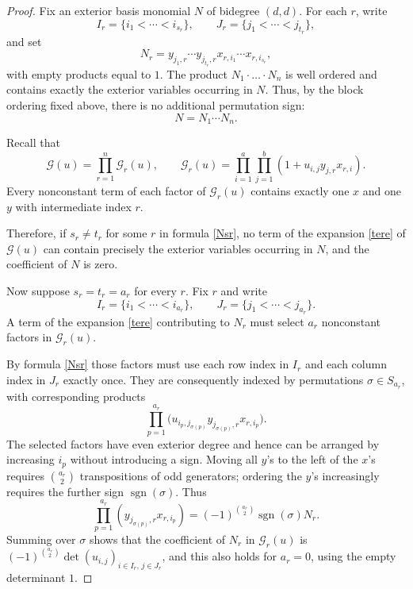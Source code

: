 \documentclass[10pt]{amsart}
\theoremstyle{definition}
\theoremstyle{remark}
\begin{document}
\begin{proof}
Fix an exterior basis monomial $N$ of bidegree $(d,d)$.
For each $r$, write
\[
 I_r=\{i_1<\cdots<i_{s_r}\},\qquad
 J_r=\{j_1<\cdots<j_{t_r}\},
\]
and set
\begin{equation}\label{Nsr}
N_r=
     y_{j_1,r}\cdots y_{j_{t_r},r}x_{r,i_1}\cdots x_{r,i_{s_r} },
\end{equation}
 with empty products equal to $1$.
The product  $N_1\cdot\ldots \cdot N_n$ is well ordered and contains exactly the exterior
variables occurring in $N$. Thus, by the block ordering fixed above, there is no additional
permutation sign:
\begin{equation}\label{eq:N-blocks}
 N=N_1\cdots N_n.
\end{equation}

Recall that
\[
 \mathcal G(u)=\prod_{r=1}^{n}\mathcal G_r(u),\qquad
 \mathcal G_r(u)=\prod_{i=1}^{a}\prod_{j=1}^{b}
 (1+u_{i,j}y_{j,r}x_{r,i}).
\]
Every nonconstant term of each factor of $\mathcal G_r(u)$ contains exactly
one $x$ and one $y$ with intermediate index $r$. 

Therefore, if
$s_r\ne t_r$ for some $r$ in formula \eqref{Nsr}, no term   of the expansion \eqref{tere} of $\mathcal G(u)$ can
contain precisely the exterior variables occurring in $N$, and
the coefficient of $N$ is zero.\smallskip

Now suppose $s_r=t_r=a_r$ for every $r$. Fix $r$ and write
\[
 I_r=\{i_1<\cdots<i_{a_r}\},\qquad
 J_r=\{j_1<\cdots<j_{a_r}\}.
\]
A term  of the expansion \eqref{tere}   contributing to $N_r$ must select $a_r$ nonconstant
factors in $\mathcal G_r(u)$. 


By formula \eqref{Nsr} those factors must use each row
index in $I_r$ and each column index in $J_r$ exactly once.
They are consequently indexed by permutations
$\sigma\in S_{a_r}$, with corresponding products
\[
 \prod_{p=1}^{a_r}
 \bigl(u_{i_p,j_{\sigma(p)}}y_{j_{\sigma(p)},r}x_{r,i_p}\bigr).
\]
The selected factors have even exterior degree and hence can
be arranged by increasing $i_p$ without introducing a sign.
Moving all $y$'s to the left of the $x$'s requires
$\binom{a_r}{2}$ transpositions of odd generators; ordering the
$y$'s increasingly requires the further sign
$\operatorname{sgn}(\sigma)$. Thus
\[
 \prod_{p=1}^{a_r}(y_{j_{\sigma(p)},r} x_{r,i_p})
 =(-1)^{\binom{a_r}{2}}\operatorname{sgn}(\sigma)N_r.
\]
Summing over $\sigma$ shows that the coefficient of $N_r$ in
$\mathcal G_r(u)$ is
\(
 (-1)^{\binom{a_r}{2}}
 \det(u_{i,j})_{i\in I_r,\,j\in J_r}
\),
and this also holds for $a_r=0$, using the empty determinant $1$.\smallskip


\end{proof}
\end{document}
